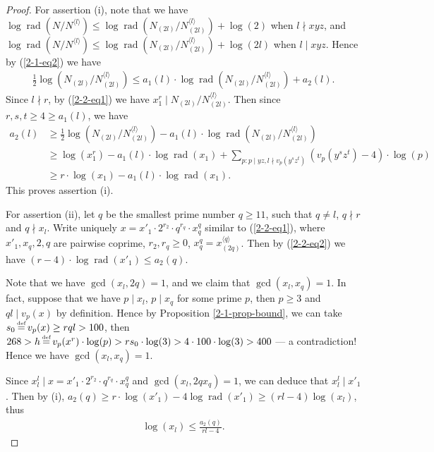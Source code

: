 \documentclass[a4paper, 12pt]{article}
\DeclareMathOperator{\defeq}{\overset{\text{\tiny{def}}}{=}}
\DeclareMathOperator{\rad}{\text{rad}}
\newcommand{\lagk}[1]{\langle #1 \rangle}
\newcommand{\lagl}{\langle l \rangle}
\numberwithin{equation}{section}
\theoremstyle{definition}
\begin{document}
\begin{proof}
For assertion (i), note that we have $\log\rad(N / N^{\lagl}) \le \log\rad( N_{(2l)} / N_{(2l)}^{\lagl} ) + \log(2)$ when $l\nmid xyz$, and $\log\rad(N/ N^{\lagl}) \le \log\rad( N_{(2l)} / N_{(2l)}^{\lagl} ) + \log(2l)$ when $l\mid xyz$.
Hence by (\ref{2-1-eq2}) we have 
\small\begin{align}   
\frac{1}{2}\log(N_{(2l)} / N_{(2l)}^{\lagl}) \le a_1(l)\cdot \log\rad( N_{(2l)} / N_{(2l)}^{\lagl} ) + a_2(l) .
\end{align}\normalsize
Since $l\nmid r$, by (\ref{2-2-eq1}) we have $x_1^r \mid N_{(2l)} / N_{(2l)}^{\lagl} $.
Then since $r,s,t \ge 4 \ge a_1(l)$, we have
\small\begin{align*} 
a_2(l) 
&\ge\frac{1}{2}\log(N_{(2l)} / N_{(2l)}^{\lagl}) - a_1(l)\cdot \log\rad( N_{(2l)} / N_{(2l)}^{\lagl} ) \\
&\ge \log(x_1^r)-a_1(l)\cdot \log\rad(x_1) + \sum_{p: p\mid yz, l\nmid v_p(y^s z^t)} (v_p(y^s z^t) -4)\cdot\log(p) \\
& \ge r \cdot \log(x_1) - a_1(l) \cdot \log\rad(x_1) .
\end{align*}\normalsize
This proves assertion (i).

For assertion (ii), let $q$ be the smallest prime number $q\ge 11$, such that $q\neq l$, $q\nmid r$ and $q \nmid x_l$.
Write uniquely $x = x'_1 \cdot 2^{r_2} \cdot q^{r_q} \cdot x_q^{q}$ similar to (\ref{2-2-eq1}), where $x'_1, x_q, 2, q$ are pairwise coprime, $r_2, r_q \ge 0$, $x_q^q = x_{(2q)}^{\lagk{q}}$.
Then by  (\ref{2-2-eq2}) we have $(r - 4) \cdot \log\rad(x'_1) \le a_2(q)$.

Note that we have $\gcd(x_l, 2q) = 1$, and we claim that $\gcd(x_l, x_q) = 1$. 
In fact, suppose that we have $p \mid x_l$, $p\mid x_q$ for some prime $p$, then $p\ge 3$ and $ql \mid v_p(x)$ by definition. 
Hence by Proposition \ref{2-1-prop-bound}, we can take $s_0 \defeq v_p(x) \ge rql > 100$, then $268 > h\defeq v_p(x^r) \cdot \log(p) > r s_0 \cdot \log(3) > 4\cdot 100 \cdot \log(3) > 400$ ---  a contradiction! 
Hence we have $\gcd(x_l, x_q) = 1$.

Since $x_l^l \mid x = x'_1 \cdot 2^{r_2} \cdot q^{r_q} \cdot x_q^{q}$ and $\gcd(x_l, 2 q x_q) = 1$, we can deduce that $x_l^l \mid x'_1$. 
Then by (i), $a_2(q) \ge r\cdot \log(x'_1) - 4\log\rad(x'_1)  \ge (rl-4) \log(x_l)$, thus 
\small\begin{align}  \label{2-2-eq3}
\log(x_l) \le \frac{a_2(q)}{rl-4} .
\end{align}\normalsize


\end{proof}
\end{document}
